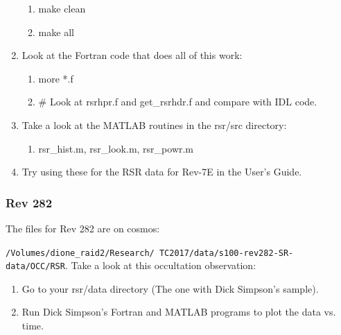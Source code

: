 \documentclass[crop=false,class=article,oneside]{standalone}
\begin{document}
\begin{enumerate}
\begin{enumerate}
                    \item[] make clean
                    \item[] make all
                \end{enumerate}
                \item Look at the Fortran code that does all of this work:
                \begin{enumerate}
                    \item[] more *.f
                    \item[] \# Look at rsrhpr.f and get\_rsrhdr.f and compare with IDL code.
                \end{enumerate}
                \item Take a look at the MATLAB routines in the rsr/src directory:
                \begin{enumerate}
                    \item[] rsr\_hist.m, rsr\_look.m, rsr\_powr.m
                \end{enumerate}
                \item Try using these for the RSR data for Rev-7E in the User's Guide.
            \end{enumerate}
        \subsubsection{Rev 282}
            The files for Rev 282 are on cosmos:
            \par
            \texttt{/Volumes/dione\_raid2/Research/%
                    TC2017/data/s100-rev282-SR-data/OCC/RSR}.
            Take a look at this occultation observation:
            \begin{enumerate}
                \item Go to your rsr/data directory
                      (The one with Dick Simpson's sample).
                \item Run Dick Simpson's Fortran and MATLAB
                      programs to plot the data vs. time.
            \end{enumerate}
\end{document}
